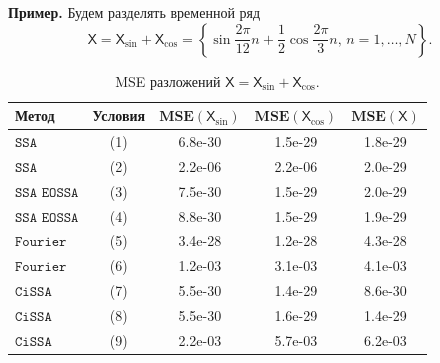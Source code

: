 \documentclass[12pt, specialist, subf
]{disser}
\theoremstyle{definition}
\newcommand{\SSA}{\texttt{SSA}}
\newcommand{\EOSSA}{\texttt{SSA EOSSA}}
\newcommand{\CISSA}{\texttt{CiSSA}}
\newcommand{\FOURIER}{\texttt{Fourier}}
\newcommand{\TS}{\mathsf{X}}
\newcommand{\MSE}{\textbf{MSE}}
\begin{document}
\textbf{\large{Пример.}} Будем разделять временной ряд 
\[ \TS = \TS_{\sin} + \TS_{\cos} = 
\left\{ 
	\sin{\frac{2\pi}{12}n} + \frac{1}{2}\cos{\frac{2\pi}{3}n}, \, n = 1, \dots, N \right\}.\]

\begin{table}[H]
\centering
\caption{MSE разложений \(\TS = \TS_{\sin} + \TS_{\cos}\).}
\label{tab:exact_not_noised_results}
\begin{tabular}{l|c|ccc}
  \hline
  \textbf{Метод} & \textbf{Условия} & \(\MSE(\TS_{\sin})\) & \(\MSE(\TS_{\cos})\) & \(\MSE(\TS)\) \\ 
  \hline
  $\SSA$    & (1) & 6.8e-30 & 1.5e-29 & 1.8e-29 \\ 
  $\SSA$    & (2) & 2.2e-06 & 2.2e-06 & 2.0e-29 \\ 
  \hline
  $\EOSSA$  & (3) & 7.5e-30 & 1.5e-29 & 2.0e-29 \\ 
  $\EOSSA$  & (4) & 8.8e-30 & 1.5e-29 & 1.9e-29 \\ 
  \hline
  $\FOURIER$    & (5) & 3.4e-28 & 1.2e-28 & 4.3e-28 \\ 
  $\FOURIER$ & (6) & 1.2e-03 & 3.1e-03 & 4.1e-03 \\ 
  \hline
  $\CISSA$  & (7) & 5.5e-30 & 1.4e-29 & 8.6e-30 \\ 
  $\CISSA$ & (8) & 5.5e-30 & 1.6e-29 & 1.4e-29 \\ 
  $\CISSA$ & (9) & 2.2e-03 & 5.7e-03 & 6.2e-03 \\ 
  \hline
\end{tabular}
\end{table}
\end{document}
